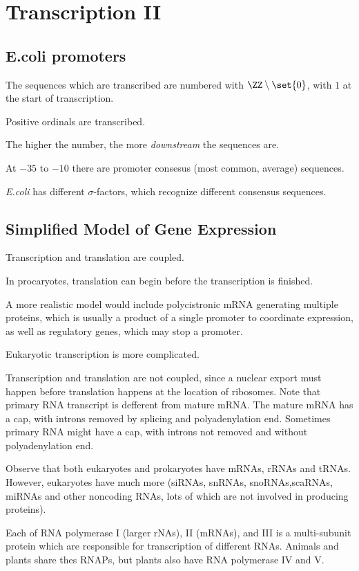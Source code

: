 \documentclass[11pt]{scrartcl}
\begin{document}
\section{Transcription II}

\subsection{E.coli promoters}

The sequences which are transcribed are numbered with
$\ZZ\setminus\set{0}$, with $1$ at the start of transcription.

Positive ordinals are transcribed.

The higher the number, the more \textit{downstream} the sequences are. 

At $-35$ to $-10$ there are promoter consesus (most common, average)
sequences.

\textit{E.coli} has different $\sigma$-factors, which recognize
different consensus sequences.

\subsection{Simplified Model of Gene Expression}

Transcription and translation are coupled.

In procaryotes, translation can begin before the transcription is finished.

A more realistic model would include polycistronic mRNA generating
multiple proteins, which is usually a product of a single promoter to
coordinate expression, as well as regulatory genes, which may stop a promoter.

Eukaryotic transcription is more complicated.

Transcription and translation are not coupled, since a nuclear export
must happen before translation happens at the location of
ribosomes. Note that primary RNA transcript is defferent from mature
mRNA. The mature mRNA has a cap, with introns removed by splicing and
polyadenylation end. Sometimes primary RNA might have a cap, with
introns not removed and without polyadenylation end.

Observe that both eukaryotes and prokaryotes have mRNAs, rRNAs and
tRNAs. However, eukaryotes have much more (siRNAs, snRNAs,
snoRNAs,scaRNAs, miRNAs and other noncoding RNAs, lots of which are
not involved in producing proteins).

Each of RNA polymerase I (larger rNAs), II (mRNAs), and III is a
multi-subunit protein which are responsible for transcription of
different RNAs. Animals and plants share thes RNAPs, but plants also
have RNA polymerase IV and V.
\end{document}
